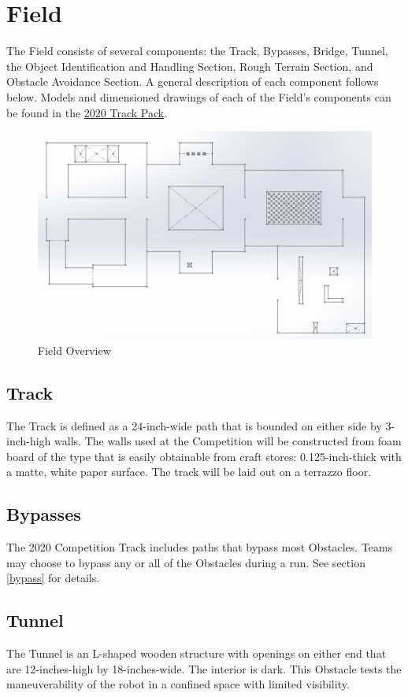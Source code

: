 \section{Field}
The Field consists of several components: the Track, Bypasses, Bridge, Tunnel, the Object Identification and Handling Section, Rough Terrain Section, and Obstacle Avoidance Section. A general description of each component follows below. Models and dimensioned drawings of each of the Field’s components can be found in the {\href{https://mercury.okstate.edu/content/mercury-challenge}{2020 Track Pack}}.

\begin{figure}[H]
	\centering
	\includegraphics[width=.85\textwidth]{images/track_overview_wlabels.png}
	\caption{Field Overview}
	\label{fig:field} 
\end{figure}

\subsection{Track}
The Track is defined as a 24-inch-wide path that is bounded on either side by 3-inch-high walls. The walls used at the Competition will be constructed from foam board of the type that is easily obtainable from craft stores: 0.125-inch-thick with a matte, white paper surface. The track will be laid out on a terrazzo floor.

\subsection{Bypasses}
The 2020 Competition Track includes paths that bypass most Obstacles. Teams may choose to bypass any or all of the Obstacles during a run. See section \ref{bypass} for details.

\subsection{Tunnel}
The Tunnel is an L-shaped wooden structure with openings on either end that are 12-inches-high by 18-inches-wide. The interior is dark. This Obstacle tests the maneuverability of the robot in a confined space with limited visibility.

